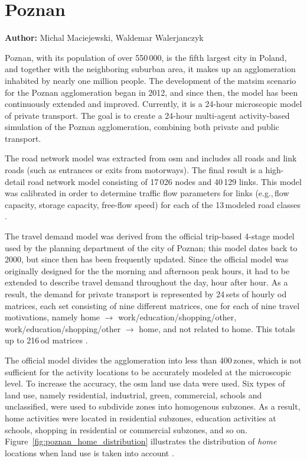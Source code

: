 \section{Poznan}
\label{sec:poznan}
\hfill \textbf{Author:} Michal Maciejewski, Waldemar Walerjanczyk

Poznan, with its population of over 550\,000, is the fifth largest city in Poland, and together with the neighboring suburban area, it makes up an agglomeration inhabited by nearly one million people. The development of the \gls{matsim} scenario for the Poznan agglomeration began in 2012, and since then, the model has been continuously extended and improved. Currently, it is a 24-hour microscopic model of private transport. The goal is to create a 24-hour multi-agent activity-based simulation of the Poznan agglomeration, combining both private and public transport.

The road network model was extracted from \gls{osm} and includes all roads and link roads (such as entrances or exits from motorways). The final result is a high-detail road network model consisting of 17\,026 nodes and 40\,129 links. This model was calibrated in order to determine traffic flow parameters for links (e.g.,\,flow capacity, storage capacity, free-flow speed) for each of the 13\,modeled road classes \citep{PiatkowskiMaciejewski2012osmNetwork}.

The travel demand model was derived from the official trip-based 4-stage model used by the planning department of the city of Poznan; this model dates back to 2000, but since then has been frequently updated. Since the official model was originally designed for the the morning and afternoon peak hours, it had to be extended to describe travel demand throughout the day, hour after hour. As a result, the demand for private transport is represented by 24\,sets of hourly \gls{od} matrices, each set consisting of nine different matrices, one for each of nine travel motivations, namely home $\rightarrow$ work/education/shopping/other, work/education/shopping/other $\rightarrow$ home, and not related to home. This totals up to 216\,\gls{od} matrices \citep{PiatkowskiEtAl2013Poznan24hSimulation, MaciejewskiEtAl2014MikroMakro}.

The official model divides the agglomeration into less than 400\,zones, which is not sufficient for the activity locations to be accurately modeled at the microscopic level. To increase the accuracy, the \gls{osm} land use data were used. Six types of land use, namely residential, industrial, green, commercial, schools and unclassified, were used to subdivide zones into homogenous subzones. As a result, home activities were located in residential subzones, education activities at schools, shopping in residential or commercial subzones, and so on. Figure~\ref{fig:poznan_home_distribution} illustrates the distribution of \emph{home} locations when land use is taken into account \cite{PiatkowskiMaciejewski2013LandUse}.

